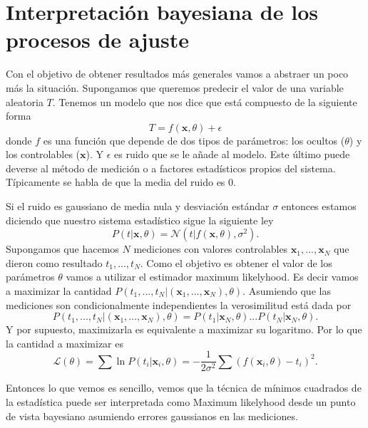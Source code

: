 \section{Interpretaci\'on bayesiana de los procesos de ajuste}
Con el objetivo de obtener resultados m\'as generales vamos a abstraer un poco m\'as la situaci\'on. Supongamos que queremos predecir el valor de una variable aleatoria $T$. Tenemos un modelo que nos dice que est\'a compuesto de la siguiente forma
\begin{equation}
    T = f(\mathbf{x},\theta) + \epsilon
\end{equation}
donde $f$ es una funci\'on que depende de dos tipos de par\'ametros: los ocultos ($\theta$) y los controlables ($\mathbf{x}$). Y $\epsilon$ es ruido que se le añade al modelo. Este \'ultimo puede deverse al m\'etodo de medici\'on o a factores estad\'isticos propios del sistema. T\'ipicamente se habla de que la media del ruido es 0.

Si el ruido es gaussiano de media nula y desviaci\'on est\'andar $\sigma$ entonces estamos diciendo que nuestro sistema estad\'istico sigue la siguiente ley
\begin{equation}
    P(t|\mathbf{x},\theta) = \mathcal{N}(t|f(\mathbf{x},\theta),\sigma^2).
    \label{4:eq:error}
\end{equation}
Supongamos que hacemos $N$ mediciones con valores controlables $\mathbf{x}_1,...,\mathbf{x}_N$ que dieron como resultado $t_1,...,t_N$. Como el objetivo es obtener el valor de los par\'ametros $\theta$ vamos a utilizar el estimador maximum likelyhood. Es decir vamos a maximizar la cantidad $P(t_1,...,t_N|(\mathbf{x}_1,...,\mathbf{x}_N),\theta)$. Asumiendo que las mediciones son condicionalmente independientes la verosimilitud est\'a dada por
\begin{equation}
    P(t_1,...,t_N|(\mathbf{x}_1,...,\mathbf{x}_N),\theta) = P(t_1|\mathbf{x}_N,\theta)...P(t_N|\mathbf{x}_N,\theta).
\end{equation}
Y por supuesto, maximizarla es equivalente a maximizar su logaritmo. Por lo que la cantidad a maximizar es 
\begin{equation}
    \mathcal{L}(\theta) = \sum \ln P(t_i|\mathbf{x}_i,\theta) = -\frac{1}{2\sigma^2} \sum (f(\mathbf{x}_i,\theta)-t_i)^2.
\end{equation}

Entonces lo que vemos es sencillo, vemos que la t\'ecnica de m\'inimos cuadrados de la estad\'istica puede ser interpretada como Maximum likelyhood desde un punto de vista bayesiano asumiendo errores gaussianos en las mediciones.



